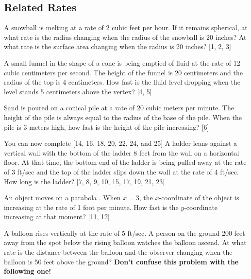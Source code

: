 \documentclass[addpoints, 12pt]{exam}
\begin{document}
\newpage
{}
\subsection*{Related Rates}
\begin{questions}
    \question A snowball is melting at a rate of 2 cubic feet per hour.  If it remains spherical, at what rate is the radius changing when the radius of the snowball is 20 inches?  At what rate is the surface area changing when the radius is 20 inches?  [1, 2, 3]
    
    \question A small funnel in the shape of a cone is being emptied of fluid at the rate of 12 cubic centimeters per second.  The height of the funnel is 20 centimeters and the radius of the top is 4 centimeters.  How fast is the fluid level dropping when the level stands 5 centimeters above the vertex?  [4, 5]
    
    \newpage
    
    \question Sand is poured on a conical pile at a rate of 20 cubic meters per minute.  The height of the pile is always equal to the radius of the base of the pile.  When the pile is 3 meters high, how fast is the height of the pile increasing?  [6]
    
    You can now complete [14, 16, 18, 20, 22, 24, and 25]
    \question A ladder leans against a vertical wall with the bottom of the ladder 8 feet from the wall on a horizontal floor.  At that time, the bottom end of the ladder is being pulled away at the rate of 3 ft/sec and the top of the ladder slips down the wall at the rate of 4 ft/sec.  How long is the ladder?  [7, 8, 9, 10, 15, 17, 19, 21, 23]
    
    \question An object moves on a parabola  .  When $x = 3$, the $x$-coordinate of the object is increasing at the rate of 1 foot per minute.  How fast is the $y$-coordinate increasing at that moment?  [11, 12]
    
    \newpage
    
    \question A balloon rises vertically at the rate of 5 ft/sec.  A person on the ground 200 feet away from the spot below the rising balloon watches the balloon ascend.  At what rate is the distance between the balloon and the observer changing when the balloon is 50 feet above the ground? \textbf{Don’t confuse this problem with the following one!}
    

\end{questions}
\end{document}
